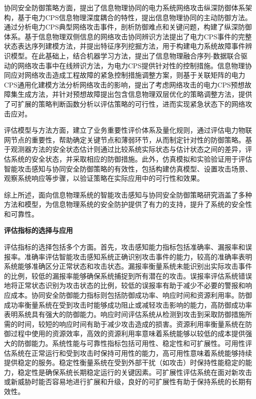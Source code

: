 协同安全防御策略方面，提出了信息物理协同的电力系统网络攻击纵深防御体系架构，基于电力CPS信息物理深度耦合的特性，提出信息物理协同的主动防御方法。通过分析电力CPS典型网络攻击事件，剖析防御难点和关键问题，构建了纵深防御体系。基于信息物理双侧信息的网络攻击协同辨识方法提出了电力CPS事件的完整状态表达序列建模方法，并提出特征序列挖掘方法，用于构建电力系统故障事件辨识模型。在此基础上，结合机器学习方法，提出了信息物理融合序列-数据联合驱动的网络攻击事中在线辨识方法，为电力CPS提供针对性的控制措施。信息物理协同应对网络攻击造成工程故障的紧急控制措施调整方案，则基于关联矩阵的电力CPS通用化建模方法分析网络攻击的影响，提出了考虑网络攻击的电力CPS预想故障集生成方法，并针对预想故障提出包含信息物理双层优化的策略调整方法，提供了可扩展的策略判断函数分析以评估策略的可行性，进而实现紧急状态下的网络攻击应对。

评估模型与方法方面，建立了业务重要性评价体系及量化规则，通过评估电力物联网节点的重要性，帮助确定关键节点和薄弱环节，从而制定针对性的防御策略。基于观测器方法的安全状态估计则通过比较系统实际状态与估计状态之间的差异，评估系统的安全状态，并采取相应的防御措施。此外，仿真模拟和实验验证用于评估智能攻击感知与协同安全防御策略的有效性，包括构建仿真模型、设置攻击场景、观察系统响应等步骤，以验证策略在实际应用中的可行性和效果。

综上所述，面向信息物理系统的智能攻击感知与协同安全防御策略研究涵盖了多种方法和模型，为信息物理系统的安全防护提供了有力的支持，提升了系统的安全性和可靠性。

\textbf{评估指标的选择与应用}

评估指标的选择包括多个方面。首先，攻击感知能力指标包括准确率、漏报率和误报率。准确率评估智能攻击感知系统正确识别攻击事件的能力，较高的准确率表明系统能够准确区分正常状态和攻击状态。漏报率衡量系统未能识别出实际攻击事件的比例，较低的漏报率能够确保系统捕捉到所有潜在的攻击。误报率评估系统错误地将正常状态识别为攻击状态的比例，较低的误报率有助于减少不必要的警报和响应成本。协同安全防御能力指标则包括防御成功率、响应时间和资源利用率。防御成功率衡量系统在受到攻击时能够成功阻止或减轻攻击影响的能力，高防御成功率表明系统具有强大的防御能力。响应时间评估系统从检测到攻击到采取防御措施所需的时间，较短的响应时间有助于减少攻击造成的损害。资源利用率衡量系统在防御过程中使用的资源效率，高效的资源利用率意味着系统能够以较低的成本提供强大的防御能力。系统性能与可靠性指标包括可用性、稳定性和可扩展性。可用性评估系统在正常运行和受到攻击时保持可用性的能力，高可用性意味着系统能够持续提供稳定的服务。稳定性衡量系统在受到外部干扰（如攻击）时保持性能稳定的能力，稳定性是确保系统长期稳定运行的关键因素。可扩展性评估系统在面对新攻击或新威胁时能否容易地进行扩展和升级，良好的可扩展性有助于保持系统的长期有效性。

